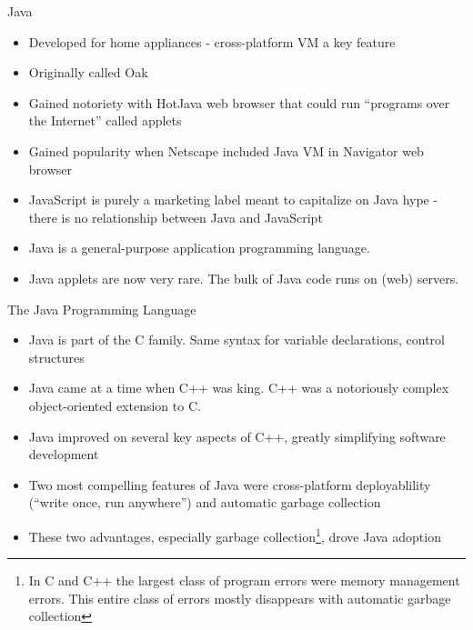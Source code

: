 \documentclass{beamer}
\author[Chris Simpkins] 
{Christopher Simpkins \\\texttt{chris.simpkins@gatech.edu}}
\institute[Georgia Tech] %
\date[CS 1331]{}
\begin{document}
\begin{frame}
  \titlepage
\end{frame}

\begin{frame}[fragile]{Java}

\begin{itemize}
\item Developed for home appliances - cross-platform VM a key feature
\item Originally called Oak
\item Gained notoriety with HotJava web browser that could run ``programs over the Internet'' called applets
\item Gained popularity when Netscape included Java VM in Navigator web browser
\item JavaScript is purely a marketing label meant to capitalize on Java hype - there is no relationship between Java and JavaScript
\item  Java is a general-purpose application programming language.  
\item Java applets are now very rare.  The bulk of Java code runs on (web) servers.
\end{itemize}

\end{frame}

\begin{frame}[fragile]{The Java Programming Language}


\begin{itemize}
\item Java is part of the C family.  Same syntax for variable
  declarations, control structures
\item Java came at a time when C++ was king.  C++ was a notoriously complex
  object-oriented extension to C.
\item Java improved on several key aspects of C++, greatly simplifying
  software development
\item Two most compelling features of Java were cross-platform
  deployablility (``write once, run anywhere'') and automatic garbage
  collection
\item These two advantages, especially garbage collection\footnote{In
    C and C++ the largest class of program errors were memory
    management errors.  This entire class of errors mostly disappears
    with automatic garbage collection}, drove Java adoption
\end{itemize}

\end{frame}
\end{document}
